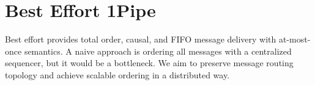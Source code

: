 \section{Best Effort 1Pipe}
\label{sec:unreliable}


Best effort \sys{} provides total order, causal, and FIFO message delivery with at-most-once semantics.
A naive approach is ordering all messages with a centralized sequencer, but it would be a bottleneck.
We aim to preserve message routing topology and achieve scalable ordering in a distributed way.









